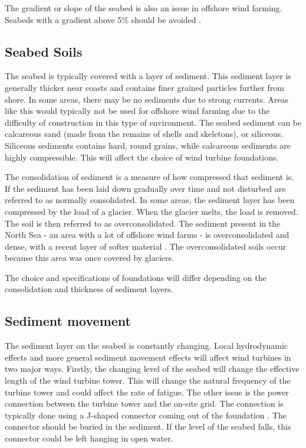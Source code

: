 \documentclass[12pt]{article} %
\begin{document}
The gradient or slope of the seabed is also an issue in offshore wind farming. Seabeds with a gradient above 5\% should be avoided \cite{antonio_pantaleo_feasibility_2005}.

\subsection{Seabed Soils}
The seabed is typically covered with a layer of sediment. This sediment layer is generally thicker near coasts and contains finer grained particles further from shore.
In some areas, there may be no sediments due to strong currents. Areas like this would typically not be used for offshore wind farming due to the difficulty of construction in this type of environment.
The seabed sediment can be calcareous sand (made from the remains of shells and skeletons), or siliceous. Siliceous sediments contains hard, round grains, while calcareous sediments are highly compressible. This will affect the choice of wind turbine foundations.

The consolidation of sediment is a measure of how compressed that sediment is. If the sediment has been laid down gradually over time and not disturbed are referred to as normally consolidated. In some areas, the sediment layer has been compressed by the load of a glacier. When the glacier melts, the load is removed. The soil is then referred to as overconsolidated. The sediment present in the North Sea - an area with a lot of offshore wind farms - is overconsolidated and dense, with a recent layer of softer material \cite{randolph_offshore_2011}. The overconsolidated soils occur because this area was once covered by glaciers.

The choice and specifications of foundations will differ depending on the consolidation and thickness of sediment layers.


\subsection{Sediment movement}
The sediment layer on the seabed is constantly changing. Local hydrodynamic effects and more general sediment movement effects will affect wind turbines in two major ways. Firstly, the changing level of the seabed will change the effective length of the wind turbine tower. This will change the natural frequency of the turbine tower and could affect the rate of fatigue.
The other issue is the power connection between the turbine tower and the on-site grid. The connection is typically done using a J-shaped connector coming out of the foundation \cite{OffshoreWind:1}. The connector should be buried in the sediment. If the level of the seabed falls, this connector could be left hanging in open water.
\end{document}
